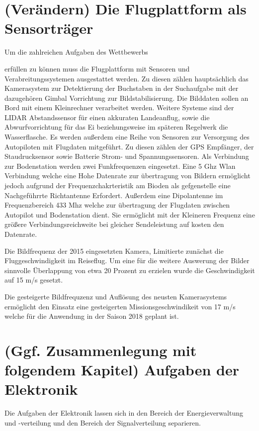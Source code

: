 \section{(Verändern) Die Flugplattform als Sensorträger}

Um die zahlreichen Aufgaben des Wettbewerbs \begin{comment} Verweis auf Wettbewerbsaufben \end{comment}
erfüllen zu können muss die Flugplattform mit Sensoren und Verabreitungssystemen ausgestattet werden.
Zu diesen zählen hauptsächlich das Kamerasystem zur Detektierung der Buchstaben in der Suchaufgabe mit der dazugehören
Gimbal Vorrichtung zur Bildstabilisierung. Die Bilddaten sollen an Bord mit einem Kleinrechner  verarbeitet werden. Weitere Systeme sind der LIDAR Abstandssensor für einen akkuraten Landeanflug, sowie die Abwurfvorrichtung für das Ei beziehungsweise im späteren Regelwerk die Wasserflasche.
Es werden außerdem eine Reihe von Sensoren zur Versorgung des Autopiloten mit Flugdaten mitgeführt. Zu diesen zählen der GPS Empfänger, der Staudrucksensor sowie Batterie Strom- und Spannungssensoren.
Als Verbindung zur Bodenstation werden zwei Funkfrequenzen eingesetzt.
Eine 5 Ghz Wlan Verbindung welche eine Hohe Datenrate zur übertragung von Bildern  ermöglicht jedoch aufgrund der Frequenzchakrteristik am Bioden als gefgenstelle eine Nachgeführrte Richtantenne Erfordert.
Außerdem eine Dipolantenne im Frequenzbereich 433 Mhz welche zur übertragung der Flugdaten zwischen Autopilot und Bodenstation dient. Sie ermöglicht mit der Kleineren Frequenz eine größere Verbindungsreichweite bei gleicher Sendeleistung auf kosten den Datenrate.

Die Bildfrequenz der 2015 eingesetzten Kamera, Limitierte zunächst die Fluggeschwindigkeit im Reiseflug. Um eine für die weitere Auswerung der Bilder sinnvolle Überlappung von etwa 20 Prozent zu erzielen wurde die Geschwindigkeit auf 15 m/s gesetzt.

Die gesteigerte Bildfrequzenz und Auflösung des neusten Kamerasystems ermöglicht den Einsatz eine gesteigerten Missionsgeschwindikeit von 17 m/s welche für die Anwendung in der Saison 2018 geplant ist.

\section{(Ggf. Zusammenlegung mit folgendem Kapitel) Aufgaben der Elektronik}

Die Aufgaben der Elektronik lassen sich in den Bereich der Energieverwaltung und -verteilung  und den Bereich der Signalverteilung separieren.

